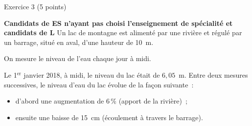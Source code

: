 
\begin{h2}Exercice 3 (5 points)\end{h2}
\textbf{Candidats de ES n'ayant pas choisi l'enseignement de spécialité et candidats de L}
\medbreak
Un lac de montagne est alimenté par une rivière et régulé par un barrage, situé en aval, d'une hauteur de 10~m.
\par
On mesure le niveau de l'eau chaque jour à midi.
\par
Le 1${^\text{er}}$ janvier 2018, à midi, le niveau du lac était de $6,05$~m.
\smallbreak
Entre deux mesures successives, le niveau d'eau du lac évolue de la façon suivante~:
\begin{itemize}[label=---]
     \item d'abord une augmentation de 6\,\% (apport de la rivière)~;
     \item ensuite une baisse de 15~cm (écoulement à travers le barrage).
\end{itemize}
